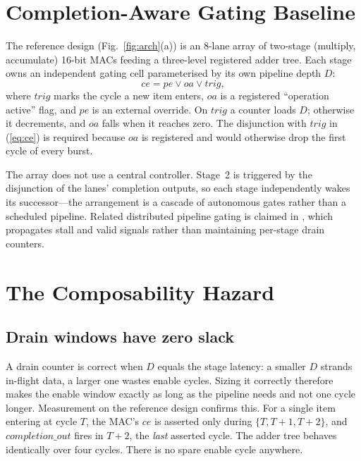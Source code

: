 \documentclass[journal,twocolumn]{IEEEtran}
\newcommand{\NMAC}{8}
\newcommand{\DWID}{16}
\begin{document}


\section{Completion-Aware Gating Baseline}
\label{sec:baseline}
The reference design (Fig.~\ref{fig:arch}(a)) is an \NMAC-lane array of
two-stage (multiply, accumulate) \DWID-bit MACs feeding a three-level
registered adder tree. Each stage owns an independent gating cell parameterised by its own
pipeline depth $D$:
\begin{equation}
\mathit{ce}=\mathit{pe}\vee\mathit{oa}\vee\mathit{trig},
\label{eq:ce}
\end{equation}
where $\mathit{trig}$ marks the cycle a new item enters, $\mathit{oa}$ is a
registered ``operation active'' flag, and $\mathit{pe}$ is an external
override. On $\mathit{trig}$ a counter loads $D$; otherwise it decrements, and
$\mathit{oa}$ falls when it reaches zero. The disjunction with
$\mathit{trig}$ in (\ref{eq:ce}) is required because $\mathit{oa}$ is
registered and would otherwise drop the first cycle of every burst.

The array does not use a central controller. Stage~2 is triggered by the
disjunction of the lanes' completion outputs, so each stage independently
wakes its successor---the arrangement is a cascade of autonomous gates rather
than a scheduled pipeline. Related distributed pipeline gating is claimed in
\cite{pat_ibm}, which propagates stall and valid signals rather than
maintaining per-stage drain counters.

\section{The Composability Hazard}
\label{sec:hazard}

\subsection{Drain windows have zero slack}
A drain counter is correct when $D$ equals the stage latency: a smaller $D$
strands in-flight data, a larger one wastes enable cycles. Sizing it correctly
therefore makes the enable window exactly as long as the pipeline needs and
not one cycle longer. Measurement on the reference design confirms this. For a
single item entering at cycle $T$, the MAC's $\mathit{ce}$ is asserted only
during $\{T,T{+}1,T{+}2\}$, and $\mathit{completion\_out}$ fires in $T{+}2$,
the \emph{last} asserted cycle. The adder tree behaves identically over four
cycles. There is no spare enable cycle anywhere.
\end{document}
